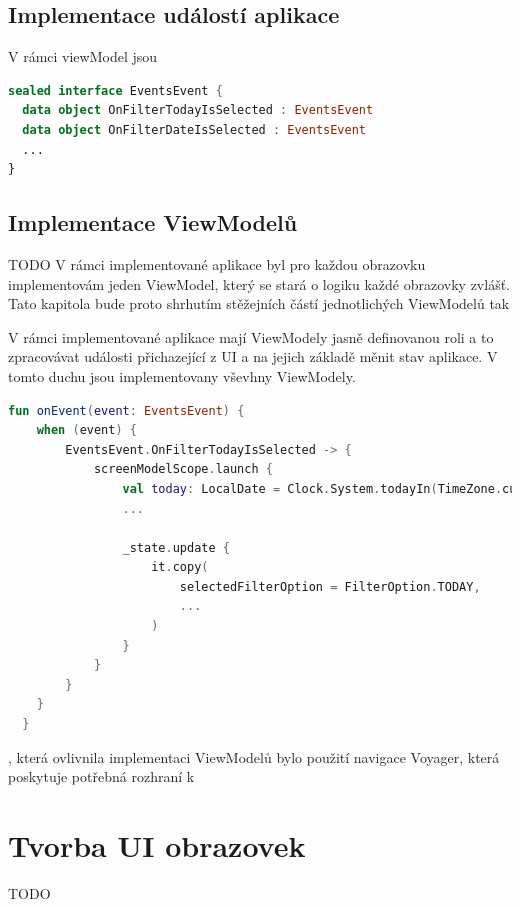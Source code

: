 \subsection{Implementace událostí aplikace} \label{eventHandlingImpl}

V rámci viewModel jsou 



\begin{lstlisting}[caption={Použití stavu v aplikaci}, label={lst:StateImpl}, language=Kotlin]
sealed interface EventsEvent {
  data object OnFilterTodayIsSelected : EventsEvent
  data object OnFilterDateIsSelected : EventsEvent
  ...
}
\end{lstlisting}


\subsection{Implementace ViewModelů} \label{ViewModelImpl}
TODO %
V rámci implementované aplikace byl pro každou obrazovku implementovám jeden ViewModel, který se stará o logiku každé obrazovky zvlášť. Tato kapitola 
bude proto shrhutím stěžejních částí jednotlichých ViewModelů tak 


V rámci implementované aplikace mají ViewModely jasně definovanou roli a to zpracovávat události přichazející z UI a na jejich základě měnit stav 
aplikace. V tomto duchu jsou implementovany vševhny ViewModely. 



\begin{lstlisting}[caption={Použití stavu v aplikaci}, label={lst:StateImpl}, language=Kotlin]
  fun onEvent(event: EventsEvent) {
    when (event) {
        EventsEvent.OnFilterTodayIsSelected -> {
            screenModelScope.launch {
                val today: LocalDate = Clock.System.todayIn(TimeZone.currentSystemDefault())
                ...

                _state.update {
                    it.copy(
                        selectedFilterOption = FilterOption.TODAY,
                        ...
                    )
                }
            }
        }
    }
  }
\end{lstlisting}

, která ovlivnila implementaci ViewModelů bylo použití navigace Voyager, která poskytuje potřebná rozhraní k 



\section{Tvorba UI obrazovek}
TODO %


